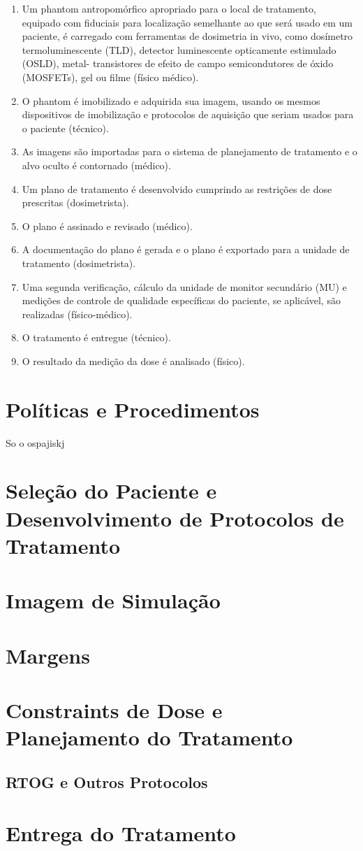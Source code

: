 \documentclass[11pt,a4paper]{article}
\begin{document}
	\begin{enumerate}[label=\textcolor{CarnationPink}{\arabic*${}^\circ$}]
		\item Um phantom  antropomórfico apropriado para o local de tratamento, equipado com fiduciais para localização semelhante ao que será usado em um paciente, é carregado com ferramentas de dosimetria in vivo, como dosímetro termoluminescente (TLD), detector luminescente opticamente estimulado (OSLD), metal- transistores de efeito de campo semicondutores de óxido (MOSFETs), gel ou filme (físico médico).
		\item O phantom é imobilizado e adquirida sua imagem, usando os mesmos dispositivos de imobilização e protocolos de aquisição que seriam usados para o paciente (técnico).
		\item As imagens são importadas para o sistema de planejamento de tratamento e o alvo oculto é contornado (médico).
		\item Um plano de tratamento é desenvolvido cumprindo as restrições de dose prescritas (dosimetrista).
		\item O plano é assinado e revisado (médico).
		\item A documentação do plano é gerada e o plano é exportado para a unidade de tratamento (dosimetrista).
		\item Uma segunda verificação, cálculo da unidade de monitor secundário (MU) e medições de controle de qualidade específicas do paciente, se aplicável, são realizadas (físico-médico).
		\item O tratamento é entregue (técnico).
		\item O resultado da medição da dose é analisado (físico).
	\end{enumerate}


\section{Políticas e Procedimentos}

So o ospajiskj
\section{Seleção do Paciente e Desenvolvimento de Protocolos de Tratamento}



\section{Imagem de Simulação}


\section{Margens}


\section{Constraints de Dose e Planejamento do Tratamento}

\subsection*{RTOG e Outros Protocolos}

\section{Entrega do Tratamento}




\end{document}
